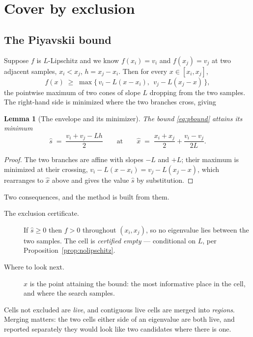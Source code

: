 \documentclass[11pt]{article}
\newtheorem{lemma}{Lemma}
\theoremstyle{definition}
\theoremstyle{remark}
\begin{document}
\section{Cover by exclusion}
\label{sec:cover}

\subsection{The Piyavskii bound}

Suppose $f$ is $L$-Lipschitz and we know $f(x_i)=v_i$ and $f(x_j)=v_j$ at two adjacent samples,
$x_i<x_j$, $h=x_j-x_i$. Then for every $x\in[x_i,x_j]$,
\begin{equation}\label{eq:pbound}
  f(x) \;\ge\; \max\bigl\{\,v_i - L(x-x_i),\ \ v_j - L(x_j-x)\,\bigr\},
\end{equation}
the pointwise maximum of two cones of slope $L$ dropping from the two samples. The right-hand
side is minimized where the two branches cross, giving

\begin{lemma}[The envelope and its minimizer]
\label{lem:envelope}
The bound \eqref{eq:pbound} attains its minimum
\begin{equation}\label{eq:env}
  \hat{s} \;=\; \frac{v_i+v_j-Lh}{2}
  \qquad\text{at}\qquad
  \hat{x} \;=\; \frac{x_i+x_j}{2} + \frac{v_i-v_j}{2L}.
\end{equation}
\end{lemma}

\begin{proof}
The two branches are affine with slopes $-L$ and $+L$; their maximum is minimized at their
crossing, $v_i-L(x-x_i)=v_j-L(x_j-x)$, which rearranges to $\hat x$ above and gives the value
$\hat s$ by substitution.
\end{proof}

Two consequences, and the method is built from them.

\begin{description}
\item[The exclusion certificate.] If $\hat s\ge0$ then $f>0$ throughout $(x_i,x_j)$, so no
eigenvalue lies between the two samples. The cell is \emph{certified empty} --- conditional on
$L$, per Proposition~\ref{prop:nolipschitz}.
\item[Where to look next.] $\hat x$ is the point attaining the bound: the most informative
place in the cell, and where the search samples.
\end{description}

Cells not excluded are \emph{live}, and contiguous live cells are merged into \emph{regions}.
Merging matters: the two cells either side of an eigenvalue are both live, and reported
separately they would look like two candidates where there is one.
\end{document}
